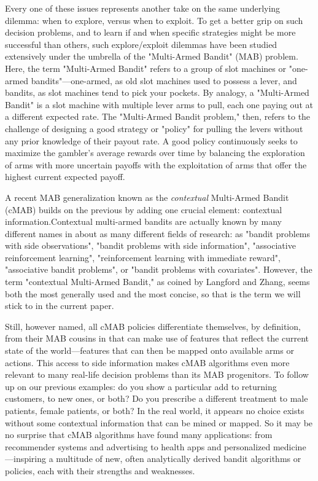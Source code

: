 \documentclass{jss}\usepackage[]{graphicx}\usepackage[]{color}
\begin{document}
Every one of these issues represents another take on the same underlying dilemma: when to explore, versus when to exploit. To get a better grip on such decision problems, and to learn if and when specific strategies might be more successful than others, such explore/exploit dilemmas have been studied extensively under the umbrella of the "Multi-Armed Bandit" (MAB) problem.
Here, the term "Multi-Armed Bandit" refers to a group of slot machines or "one-armed bandits"---one-armed, as old slot machines used to possess a lever, and bandits, as slot machines tend to pick your pockets.  By analogy, a "Multi-Armed Bandit" is a slot machine with multiple lever arms to pull, each one paying out at a different expected rate. The "Multi-Armed Bandit problem," then, refers to the challenge of designing a good strategy or "policy" for pulling the levers without any prior knowledge of their payout rate. A good policy continuously seeks to maximize the gambler's average rewards over time by balancing the exploration of arms with more uncertain payoffs with the exploitation of arms that offer the highest current expected payoff.

A recent MAB generalization known as the \textit{contextual} Multi-Armed Bandit (cMAB) builds on the previous by adding one crucial element: contextual information.Contextual multi-armed bandits are actually known by many different names in about as many different fields of research: as "bandit problems with side observations", "bandit problems with side information", "associative reinforcement learning", "reinforcement learning with immediate reward", "associative bandit problems", or "bandit problems with covariates". However, the term "contextual Multi-Armed Bandit," as coined by Langford and Zhang, seems both the most generally used and the most concise, so that is the term we will stick to in the current paper.

Still, however named, all cMAB policies differentiate themselves, by definition, from their MAB cousins in that can make use of features that reflect the current state of the world---features that can then be mapped onto available arms or actions. This access to side information makes cMAB algorithms even more relevant to many real-life decision problems than its MAB progenitors. To follow up on our previous examples: do you show a particular add to returning customers, to new ones, or both? Do you prescribe a different treatment to male patients, female patients, or both? In the real world, it appears no choice exists without some contextual information that can be mined or mapped. So it may be no surprise that cMAB algorithms have found many applications: from recommender systems and advertising to health apps and personalized medicine---inspiring a multitude of new, often analytically derived bandit algorithms or policies, each with their strengths and weaknesses.
\end{document}
